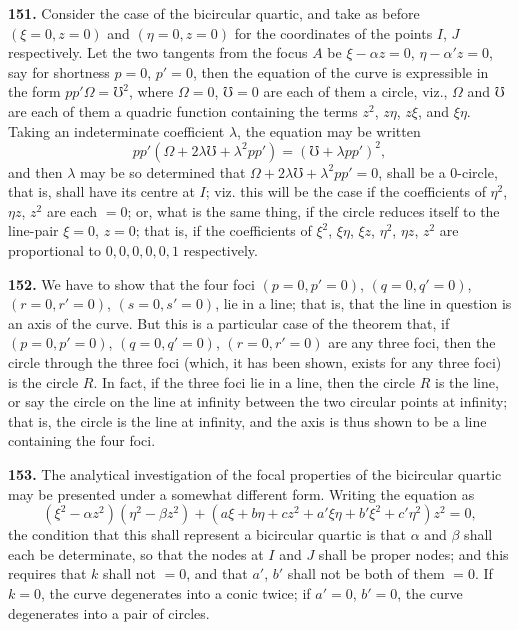 \documentclass[12pt,a4paper]{article}
\theoremstyle{definition}
\begin{document}
\noindent\textbf{151.} Consider the case of the bicircular quartic, and take as before $(\xi = 0, z = 0)$
and $(\eta = 0, z = 0)$ for the coordinates of the points $I$, $J$ respectively. Let the two
tangents from the focus $A$ be $\xi - \alpha z = 0$, $\eta - \alpha'z = 0$, say for shortness $p = 0$, $p' = 0$,
then the equation of the curve is expressible in the form $pp'\Omega = \mho^2$, where $\Omega = 0$,
$\mho = 0$ are each of them a circle, viz., $\Omega$ and $\mho$ are each of them a quadric function
containing the terms $z^2$, $z\eta$, $z\xi$, and $\xi\eta$. Taking an indeterminate coefficient $\lambda$, the
equation may be written
\[
pp'(\Omega + 2\lambda\mho + \lambda^2pp') = (\mho + \lambda pp')^2,
\]
and then $\lambda$ may be so determined that $\Omega + 2\lambda\mho + \lambda^2pp' = 0$, shall be a 0-circle,
that is, shall have its centre at $I$; viz. this will be the case if the coefficients of
$\eta^2$, $\eta z$, $z^2$ are each $= 0$; or, what is the same thing, if the circle reduces itself to
the line-pair $\xi = 0$, $z = 0$; that is, if the coefficients of $\xi^2$, $\xi\eta$, $\xi z$, $\eta^2$, $\eta z$, $z^2$ are
proportional to $0, 0, 0, 0, 0, 1$ respectively.

\newpage
\noindent\textbf{152.} We have to show that the four foci $(p = 0, p' = 0)$, $(q = 0, q' = 0)$, $(r = 0, r' = 0)$,
$(s = 0, s' = 0)$, lie in a line; that is, that the line in question is an axis of the
curve. But this is a particular case of the theorem that, if $(p = 0, p' = 0)$, $(q = 0, q' = 0)$,
$(r = 0, r' = 0)$ are any three foci, then the circle through the three foci (which, it
has been shown, exists for any three foci) is the circle $R$. In fact, if the three foci
lie in a line, then the circle $R$ is the line, or say the circle on the line at infinity
between the two circular points at infinity; that is, the circle is the line at infinity,
and the axis is thus shown to be a line containing the four foci.

\noindent\textbf{153.} The analytical investigation of the focal properties of the bicircular quartic
may be presented under a somewhat different form. Writing the equation as
\[
(\xi^2 - \alpha z^2)(\eta^2 - \beta z^2) + (a\xi + b\eta + cz^2 + a'\xi\eta + b'\xi^2 + c'\eta^2)z^2 = 0,
\]
the condition that this shall represent a bicircular quartic is that $\alpha$ and $\beta$ shall each
be determinate, so that the nodes at $I$ and $J$ shall be proper nodes; and this requires
that $k$ shall not $= 0$, and that $a'$, $b'$ shall not be both of them $= 0$. If $k = 0$, the
curve degenerates into a conic twice; if $a' = 0$, $b' = 0$, the curve degenerates into a pair
of circles.
\end{document}
